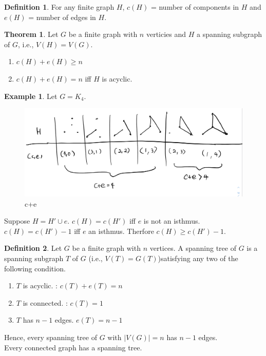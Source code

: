 \documentclass{article}
\theoremstyle{definition}
\newtheorem{defn}{Definition}[]
\newtheorem{thm}{Theorem}[]
\newtheorem{ex}{Example}[]
\newenvironment{pf*}{\pushQED{\qed}\pf}{\popQED\endpf}
\begin{document}
\begin{defn}
    For any finite graph $H$, $c(H)$ = number of components in $H$ and
     $e(H)$ = number of edges in $H$.
\end{defn}
\begin{thm}
    Let $G$ be a finite graph with $n$ verticies and $H$ a 
    spanning subgraph of $G$, i.e., $V(H) = V(G)$.
    \begin{enumerate}
        \item $c(H) + e(H) \ge n$
        \item $c(H) + e(H) = n $ iff $H$ is acyclic. 
    \end{enumerate} 
\end{thm}
\begin{ex}
    Let $G = K_4$.
    \begin{figure}[!h]
        \centerline{\includegraphics[width=0.8\columnwidth]{img/ce_acyclic.jpeg}}
        \caption{c+e}
        \label{ce} 
    \end{figure}
\end{ex}
\begin{pf*}
    Suppose $H = H' \cup e$. $c(H) = c(H')$ iff $e$ is not an isthmus.
    $c(H) = c(H') - 1$ iff $e$ an isthmus. Therfore $c(H) \ge c(H') - 1$.
\end{pf*}
\begin{defn}
    Let $G$ be a finite graph with $n$ vertices. A spanning tree
    of $G$ is a spanning subgraph $T$ of $G$ (i.e., $V(T) = G(T)$)satisfying any two of
    the following condition.
    \begin{enumerate}
        \item $T$ is acyclic. : $c(T) + e(T) = n$
        \item $T$ is connected. : $c(T) = 1$
        \item $T$ has $n-1 $ edges. $e(T) = n- 1$
    \end{enumerate}
\end{defn}
Hence, every spanning tree of $G$ with $\vert V(G) \vert = n$
has $n-1$ edges. \\ 
Every connected graph has a spanning tree. 
\end{document}
